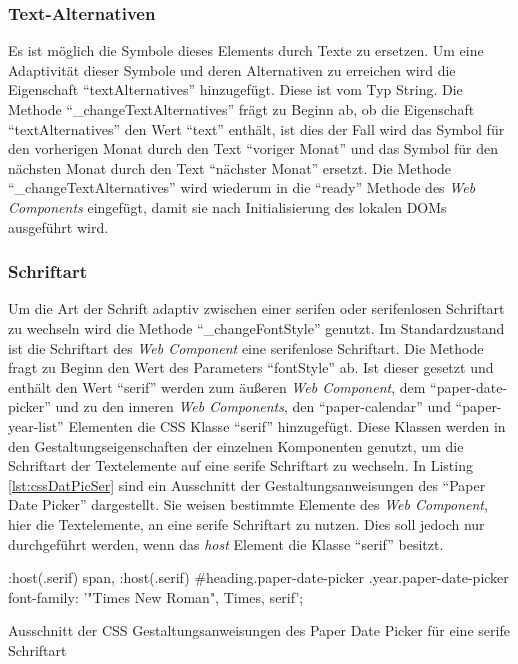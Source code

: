 \documentclass[12pt, paper=a4, bibtotoc, toc=listof, headsepline=true]{scrreprt}
\begin{document}
		\subsubsection{Text-Alternativen}
		Es ist möglich die Symbole dieses Elements durch Texte zu ersetzen. Um eine Adaptivität dieser Symbole und deren Alternativen zu erreichen wird die Eigenschaft \enquote{textAlternatives} hinzugefügt. Diese ist vom Typ String. Die Methode \enquote{\_changeTextAlternatives} frägt zu Beginn ab, ob die Eigenschaft \enquote{textAlternatives} den Wert \enquote{text} enthält, ist dies der Fall wird das Symbol für den vorherigen Monat durch den Text \enquote{voriger Monat} und das Symbol für den nächsten Monat durch den Text \enquote{nächster Monat} ersetzt. Die Methode \enquote{\_changeTextAlternatives} wird wiederum in die \enquote{ready} Methode des \emph{Web Components} eingefügt, damit sie nach Initialisierung des lokalen \ac{DOM}s ausgeführt wird. 
		\subsubsection{Schriftart}
		Um die Art der Schrift adaptiv zwischen einer serifen oder serifenlosen Schriftart zu wechseln wird die Methode \enquote{\_changeFontStyle} genutzt. Im Standardzustand ist die Schriftart des \emph{Web Component} eine serifenlose Schriftart. Die Methode fragt zu Beginn den Wert des Parameters \enquote{fontStyle} ab. Ist dieser gesetzt und enthält den Wert \enquote{serif} werden zum äußeren \emph{Web Component}, dem \enquote{paper-date-picker} und zu den inneren \emph{Web Components}, den \enquote{paper-calendar} und \enquote{paper-year-list} Elementen die \ac{CSS} Klasse \enquote{serif} hinzugefügt. Diese Klassen werden in den Gestaltungseigenschaften der einzelnen Komponenten genutzt, um die Schriftart der Textelemente auf eine serife Schriftart zu wechseln. In Listing \ref{lst:cssDatPicSer} sind ein Ausschnitt der Gestaltungsanweisungen des \enquote{Paper Date Picker} dargestellt. Sie weisen bestimmte Elemente des \emph{Web Component}, hier die Textelemente, an eine serife Schriftart zu nutzen. Dies soll jedoch nur durchgeführt werden, wenn das \emph{host} Element die Klasse \enquote{serif} besitzt.
		\begin{listing}
			\begin{CSScode*}{}
:host(.serif) span, :host(.serif) #heading.paper-date-picker .year.paper-date-picker{
   font-family: '"Times New Roman", Times, serif';
}
			\end{CSScode*}
			\caption[CSS des Paper Date Picker für serife Schriftart]{Ausschnitt der CSS Gestaltungsanweisungen des Paper Date Picker für eine serife Schriftart}
			\label{lst:cssDatPicSer}
		\end{listing}
\end{document}
